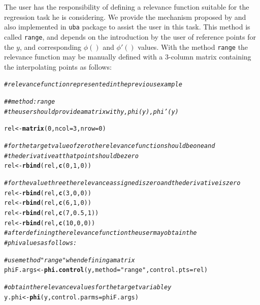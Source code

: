 \documentclass[10pt,a4paper]{article}\usepackage[]{graphicx}\usepackage[]{color}
\makeatletter
\newcommand{\hlnum}[1]{\textcolor[rgb]{0.686,0.059,0.569}{#1}}%
\newcommand{\hlstr}[1]{\textcolor[rgb]{0.192,0.494,0.8}{#1}}%
\newcommand{\hlcom}[1]{\textcolor[rgb]{0.678,0.584,0.686}{\textit{#1}}}%
\newcommand{\hlstd}[1]{\textcolor[rgb]{0.345,0.345,0.345}{#1}}%
\newcommand{\hlkwb}[1]{\textcolor[rgb]{0.69,0.353,0.396}{#1}}%
\newcommand{\hlkwc}[1]{\textcolor[rgb]{0.333,0.667,0.333}{#1}}%
\newcommand{\hlkwd}[1]{\textcolor[rgb]{0.737,0.353,0.396}{\textbf{#1}}}%
\newenvironment{kframe}{%
 \def\at@end@of@kframe{}%
 \ifinner\ifhmode%
  \def\at@end@of@kframe{\end{minipage}}%
  \begin{minipage}{\columnwidth}%
 \fi\fi%
 \def\FrameCommand##1{\hskip\@totalleftmargin \hskip-\fboxsep
 \colorbox{shadecolor}{##1}\hskip-\fboxsep
     \hskip-\linewidth \hskip-\@totalleftmargin \hskip\columnwidth}%
 \MakeFramed {\advance\hsize-\width
   \@totalleftmargin\z@ \linewidth\hsize
   \@setminipage}}%
 {\par\unskip\endMakeFramed%
 \at@end@of@kframe}
\newenvironment{knitrout}{}{} %
\makeatother
\begin{document}
The user has the responsibility of defining a relevance function suitable for the regression task he is considering. We provide the mechanism proposed by \cite{ribeiro2011utility} and also implemented in \texttt{uba} package to assist the user in this task. This method is called \texttt{range}, and depends on the introduction by the user of reference points for the $y$, and corresponding $\phi()$ and $\phi'()$ values. With the method \texttt{range} the relevance function may be manually defined with a 3-column matrix containing the interpolating points as follows:

\begin{knitrout}\footnotesize
{}\color{fgcolor}\begin{kframe}
\begin{alltt}
\hlcom{# relevance function represented in the previous example}

\hlcom{## method: range}
\hlcom{# the user should provide a matrix with y, phi(y), phi'(y)}

\hlstd{rel} \hlkwb{<-} \hlkwd{matrix}\hlstd{(}\hlnum{0}\hlstd{,} \hlkwc{ncol} \hlstd{=} \hlnum{3}\hlstd{,} \hlkwc{nrow} \hlstd{=} \hlnum{0}\hlstd{)}

\hlcom{# for the target value of zero the relevance function should be one and}
\hlcom{# the derivative at that point should be zero}
\hlstd{rel} \hlkwb{<-} \hlkwd{rbind}\hlstd{(rel,} \hlkwd{c}\hlstd{(}\hlnum{0}\hlstd{,}\hlnum{1}\hlstd{,}\hlnum{0}\hlstd{))}

\hlcom{# for the value three the relevance assigned is zero and the derivative is zero}
\hlstd{rel} \hlkwb{<-} \hlkwd{rbind}\hlstd{(rel,} \hlkwd{c}\hlstd{(}\hlnum{3}\hlstd{,}\hlnum{0}\hlstd{,}\hlnum{0}\hlstd{))}
\hlstd{rel} \hlkwb{<-} \hlkwd{rbind}\hlstd{(rel,} \hlkwd{c}\hlstd{(}\hlnum{6}\hlstd{,}\hlnum{1}\hlstd{,}\hlnum{0}\hlstd{))}
\hlstd{rel} \hlkwb{<-} \hlkwd{rbind}\hlstd{(rel,} \hlkwd{c}\hlstd{(}\hlnum{7}\hlstd{,}\hlnum{0.5}\hlstd{,}\hlnum{1}\hlstd{))}
\hlstd{rel} \hlkwb{<-} \hlkwd{rbind}\hlstd{(rel,} \hlkwd{c}\hlstd{(}\hlnum{10}\hlstd{,}\hlnum{0}\hlstd{,}\hlnum{0}\hlstd{))}
\hlcom{# after defining the relevance function the user may obtain the }
\hlcom{# phi values as follows:}

\hlcom{# use method "range" when defining a matrix}
\hlstd{phiF.args} \hlkwb{<-} \hlkwd{phi.control}\hlstd{(y,}\hlkwc{method} \hlstd{=} \hlstr{"range"}\hlstd{,} \hlkwc{control.pts} \hlstd{= rel)}

\hlcom{# obtain the relevance values for the target variable y}
\hlstd{y.phi} \hlkwb{<-} \hlkwd{phi}\hlstd{(y,}\hlkwc{control.parms} \hlstd{= phiF.args)}
\end{alltt}
\end{kframe}
\end{knitrout}
\end{document}
